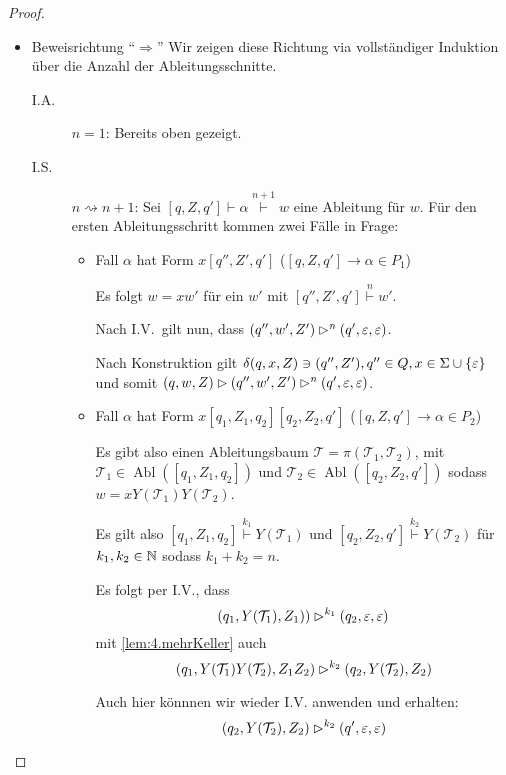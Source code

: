 \begin{proof}
    \begin{itemize}
     \item Beweisrichtung ``$\Rightarrow$''
     Wir zeigen diese Richtung via vollständiger Induktion über die Anzahl der Ableitungsschnitte.
     \begin{description}
      \item[I.A.] $n=1$: Bereits oben gezeigt.
      \item[I.S.] $n\rightsquigarrow n+1$:
      Sei $[q,Z,q']\vdash\alpha\stackrel{n+1}{\vdash} w$ eine Ableitung für $w$. Für den ersten Ableitungsschritt kommen zwei Fälle in Frage:
      \begin{itemize}
      \item Fall $\alpha$ hat Form $x[q'', Z', q']$ ($[q,Z,q']\rightarrow\alpha \in P_1$)
      
	  Es folgt $w = xw'$ für ein $w'$ mit $[q'', Z', q']\stackrel{n}{\vdash} w'$.
	  
	  Nach I.V.\ gilt nun, dass $(q'', w', Z') \rhd^n (q',\varepsilon,\varepsilon)$.
	  
	  Nach Konstruktion gilt $\delta(q, x, Z) \ni (q'', Z'), q'' \in Q, x \in \Sigma \cup \{\varepsilon\}$ und somit
	  $(q, w, Z) \rhd (q'', w', Z') \rhd^n (q',\varepsilon,\varepsilon)$.
      \item Fall $\alpha$ hat Form $x[q_1,Z_1,q_2][q_2, Z_2, q']$ ($[q,Z,q']\rightarrow\alpha \in P_2$)
      
      Es gibt also einen Ableitungsbaum $\mathcal{T} = \pi(\mathcal{T}_1,\mathcal{T}_2)$, mit $\mathcal{T}_1 \in \operatorname{Abl}([q_1, Z_1, q_2])$ und $\mathcal{T}_2 \in \operatorname{Abl}([q_2, Z_2, q'])$ sodass $w = xY(\mathcal{T}_1)Y(\mathcal{T}_2)$.
      
      Es gilt also $[q_1, Z_1, q_2]\stackrel{k_1}{\vdash} Y(\mathcal{T}_1)$ und 
      $[q_2, Z_2, q']\stackrel{k_2}{\vdash} Y(\mathcal{T}_2)$ für $k_1,k_2\in\mathbb{N}$ sodass $k_1+k_2=n$.
      
          Es folgt per I.V., dass
          \begin{displaymath}
            (q_1, Y(\mathcal{T}_1), Z_1)) \rhd^{k_1} (q_2, \varepsilon, \varepsilon)
          \end{displaymath}
          mit \autoref{lem:4.mehrKeller} auch
          \begin{displaymath}
            (q_1, Y(\mathcal{T}_1)Y(\mathcal{T}_2), Z_1Z_2) \rhd^{k_2} (q_2, Y(\mathcal{T}_2), Z_2)
          \end{displaymath}
          

      Auch hier könnnen wir wieder I.V. anwenden und erhalten:
          \begin{displaymath}
            (q_2, Y(\mathcal{T}_2), Z_2) \rhd^{k_2} (q', \varepsilon, \varepsilon)
          \end{displaymath}
          

\end{itemize}
\end{description}
\end{itemize}
\end{proof}
